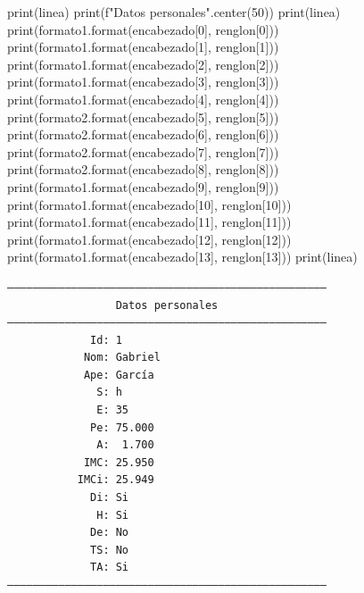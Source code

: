 \documentclass[
  spanish,
  letterpaper,
]{scrbook}
\newenvironment{Shaded}{\begin{snugshade}}{\end{snugshade}}
\newcommand{\BuiltInTok}[1]{\textcolor[rgb]{0.00,0.23,0.31}{#1}}
\newcommand{\DecValTok}[1]{\textcolor[rgb]{0.68,0.00,0.00}{#1}}
\newcommand{\NormalTok}[1]{\textcolor[rgb]{0.00,0.23,0.31}{#1}}
\newcommand{\SpecialStringTok}[1]{\textcolor[rgb]{0.13,0.47,0.30}{#1}}
\theoremstyle{definition}
\theoremstyle{remark}
\begin{document}
\begin{Shaded}
\begin{Highlighting}[]
\BuiltInTok{print}\NormalTok{(linea)}
\BuiltInTok{print}\NormalTok{(}\SpecialStringTok{f"Datos personales"}\NormalTok{.center(}\DecValTok{50}\NormalTok{))}
\BuiltInTok{print}\NormalTok{(linea)}
\BuiltInTok{print}\NormalTok{(formato1.}\BuiltInTok{format}\NormalTok{(encabezado[}\DecValTok{0}\NormalTok{], renglon[}\DecValTok{0}\NormalTok{]))}
\BuiltInTok{print}\NormalTok{(formato1.}\BuiltInTok{format}\NormalTok{(encabezado[}\DecValTok{1}\NormalTok{], renglon[}\DecValTok{1}\NormalTok{]))}
\BuiltInTok{print}\NormalTok{(formato1.}\BuiltInTok{format}\NormalTok{(encabezado[}\DecValTok{2}\NormalTok{], renglon[}\DecValTok{2}\NormalTok{]))}
\BuiltInTok{print}\NormalTok{(formato1.}\BuiltInTok{format}\NormalTok{(encabezado[}\DecValTok{3}\NormalTok{], renglon[}\DecValTok{3}\NormalTok{]))}
\BuiltInTok{print}\NormalTok{(formato1.}\BuiltInTok{format}\NormalTok{(encabezado[}\DecValTok{4}\NormalTok{], renglon[}\DecValTok{4}\NormalTok{]))}
\BuiltInTok{print}\NormalTok{(formato2.}\BuiltInTok{format}\NormalTok{(encabezado[}\DecValTok{5}\NormalTok{], renglon[}\DecValTok{5}\NormalTok{]))}
\BuiltInTok{print}\NormalTok{(formato2.}\BuiltInTok{format}\NormalTok{(encabezado[}\DecValTok{6}\NormalTok{], renglon[}\DecValTok{6}\NormalTok{]))}
\BuiltInTok{print}\NormalTok{(formato2.}\BuiltInTok{format}\NormalTok{(encabezado[}\DecValTok{7}\NormalTok{], renglon[}\DecValTok{7}\NormalTok{]))}
\BuiltInTok{print}\NormalTok{(formato2.}\BuiltInTok{format}\NormalTok{(encabezado[}\DecValTok{8}\NormalTok{], renglon[}\DecValTok{8}\NormalTok{]))}
\BuiltInTok{print}\NormalTok{(formato1.}\BuiltInTok{format}\NormalTok{(encabezado[}\DecValTok{9}\NormalTok{], renglon[}\DecValTok{9}\NormalTok{]))}
\BuiltInTok{print}\NormalTok{(formato1.}\BuiltInTok{format}\NormalTok{(encabezado[}\DecValTok{10}\NormalTok{], renglon[}\DecValTok{10}\NormalTok{]))}
\BuiltInTok{print}\NormalTok{(formato1.}\BuiltInTok{format}\NormalTok{(encabezado[}\DecValTok{11}\NormalTok{], renglon[}\DecValTok{11}\NormalTok{]))}
\BuiltInTok{print}\NormalTok{(formato1.}\BuiltInTok{format}\NormalTok{(encabezado[}\DecValTok{12}\NormalTok{], renglon[}\DecValTok{12}\NormalTok{]))}
\BuiltInTok{print}\NormalTok{(formato1.}\BuiltInTok{format}\NormalTok{(encabezado[}\DecValTok{13}\NormalTok{], renglon[}\DecValTok{13}\NormalTok{]))}
\BuiltInTok{print}\NormalTok{(linea)}
\end{Highlighting}
\end{Shaded}

\begin{verbatim}
――――――――――――――――――――――――――――――――――――――――――――――――――
                 Datos personales                 
――――――――――――――――――――――――――――――――――――――――――――――――――
             Id: 1
            Nom: Gabriel
            Ape: García
              S: h
              E: 35
             Pe: 75.000
              A:  1.700
            IMC: 25.950
           IMCi: 25.949
             Di: Si
              H: Si
             De: No
             TS: No
             TA: Si
――――――――――――――――――――――――――――――――――――――――――――――――――
\end{verbatim}
\end{document}
